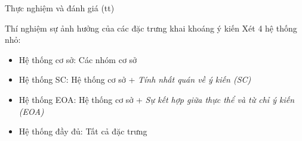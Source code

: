 \documentclass[9pt,xcolor=table,hyperref=unicode]{beamer}
\begin{document}
		\begin{frame}{Thực nghiệm và đánh giá (tt)}			
			\begin{table}[]		
			\parbox{\textwidth}{
				\centering			
				\fontsize{8pt}{10}\selectfont		
					
				\caption{Tóm tắt các đặc trưng được sử dụng trong hệ thống}
			}
			\end{table}	
			\begin{block}{Thí nghiệm sự ảnh hưởng của các đặc trưng khai khoáng ý kiến}
				Xét 4 hệ thống nhỏ:
				\begin{itemize}
					\item{Hệ thống cơ sở: Các nhóm cơ sở}
					\item{Hệ thống SC: Hệ thống cơ sở + \textit{Tính nhất quán về ý kiến (SC)}}
					\item{Hệ thống EOA: Hệ thống cơ sở + \textit{Sự kết hợp giữa thực thể và từ chỉ ý kiến (EOA)}}
					\item{Hệ thống đầy đủ: Tất cả đặc trưng}
				\end{itemize}								
			\end{block}				
		\end{frame}
\end{document}
